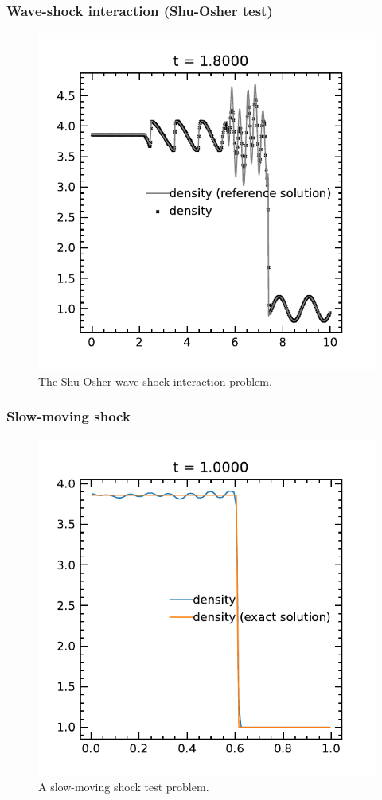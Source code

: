 \documentclass[fleqn,usenatbib]{mnras}
\begin{document}
\subsubsection{Wave-shock interaction (Shu-Osher test)}
\begin{figure}
    \includegraphics[width=\columnwidth]{hydro_shuosher.pdf}
    \caption{The Shu-Osher wave-shock interaction problem.}
    \label{fig:shu_osher}
\end{figure}
\subsubsection{Slow-moving shock}
\begin{figure}
    \includegraphics[width=\columnwidth]{hydro_sms_1.0000.pdf}
    \caption{A slow-moving shock test problem.}
    \label{fig:sms}
\end{figure}
\end{document}
